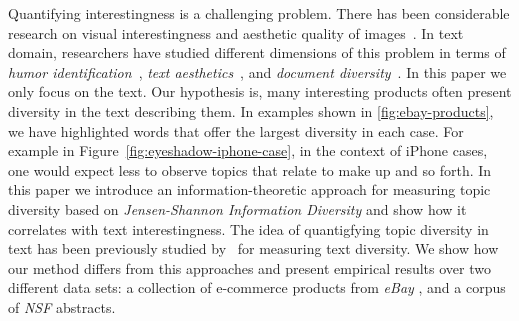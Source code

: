 \documentclass{article} %
\begin{document}
Quantifying interestingness is a challenging problem. There has been considerable research on visual interestingness and aesthetic quality of images~\cite{Datta:2006:SAP:2129560.2129588,Ke:2006:DHF:1153170.1153495,IsolaParikhTorralbaOliva2011,dhar:2011,reinecke2013predicting,journals/pami/WeinshallZHKOABGNPHP12}. 
In text domain, researchers have studied different dimensions of this problem in terms of {\em humor identification}~\cite{Mihalcea:2005:MCL:1220575.1220642,Davidov:2010:SRS:1870568.1870582,Kiddon11,labutov-lipson:2012:ACL2012short}, {\em text aesthetics}~\cite{journals:tamd:Schmidhuber10,N13-1118,ganguly:2014}, and {\em document diversity}~\cite{bache:2013}.  In this paper we only focus on the text. Our hypothesis is, many interesting products often present diversity in the text describing them. In examples shown in \ref{fig:ebay-products}, we have highlighted words that offer the largest diversity in each case.
For example in Figure~\ref{fig:eyeshadow-iphone-case}, in the context of iPhone cases, one would expect less to observe topics that relate to make up and so forth. In this paper we introduce an information-theoretic approach for measuring topic diversity based on {\em Jensen-Shannon Information Diversity} and show how it correlates with text interestingness. The idea of quantigfying topic diversity in text has been previously studied by~\cite{bache:2013} for measuring text diversity. We show how our method differs from this approaches and present empirical results over two different data sets: a collection of e-commerce products from {\sl eBay} , and a corpus of {\sl NSF} abstracts. 
\end{document}

